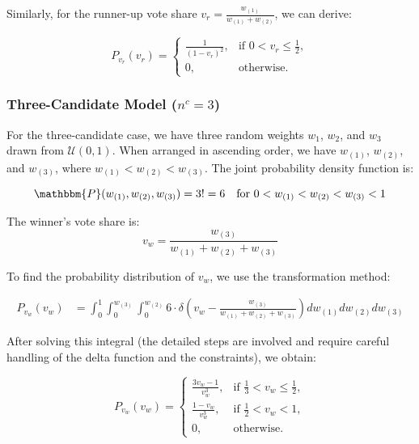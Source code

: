 Similarly, for the runner-up vote share $v_r = \frac{w_{(1)}}{w_{(1)} + w_{(2)}}$, we can derive:

\begin{equation}
P_{v_r}(v_r) = 
\begin{cases}
     \frac{1}{(1-v_r)^2}, & \text{if } 0 < v_r \leq \frac{1}{2},\\
     0, & \text{otherwise}.
\end{cases}
\end{equation}

\subsubsection{Three-Candidate Model ($n^c = 3$)}

For the three-candidate case, we have three random weights $w_1$, $w_2$, and $w_3$ drawn from $\mathcal{U}(0,1)$. When arranged in ascending order, we have $w_{(1)}$, $w_{(2)}$, and $w_{(3)}$, where $w_{(1)} < w_{(2)} < w_{(3)}$. The joint probability density function is:

\begin{equation}
    \mathbbm{P}(w_{(1)}, w_{(2)}, w_{(3)}) = 3! = 6 \quad \text{for } 0 < w_{(1)} < w_{(2)} < w_{(3)} < 1
\end{equation}

The winner's vote share is:
\begin{equation}
    v_w = \frac{w_{(3)}}{w_{(1)} + w_{(2)} + w_{(3)}}
\end{equation}

To find the probability distribution of $v_w$, we use the transformation method:

\begin{align}
    P_{v_w}(v_w) &= \int_0^1 \int_0^{w_{(3)}} \int_0^{w_{(2)}} 6 \cdot \delta\left(v_w - \frac{w_{(3)}}{w_{(1)} + w_{(2)} + w_{(3)}}\right) dw_{(1)} dw_{(2)} dw_{(3)}
\end{align}

After solving this integral (the detailed steps are involved and require careful handling of the delta function and the constraints), we obtain:

\begin{equation}
P_{v_w}(v_w) = 
\begin{cases}
     \frac{3v_w - 1}{v_w^3}, & \text{if } \frac{1}{3} < v_w \leq \frac{1}{2},\\
     \frac{1 - v_w}{v_w^3}, & \text{if } \frac{1}{2} < v_w < 1,\\
     0, & \text{otherwise}.
\end{cases}
\end{equation}

